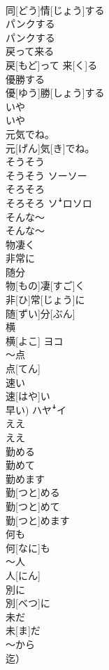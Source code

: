 \documentclass[8pt]{extreport}
\begin{document}
\begin{CJK}{UTF8}{min}
\\	同[どう]情[じょう]する	
\\	パンクする	
\\	パンクする	
\\	戻って来る	
\\	戻[もど]って 来[く]る	
\\	優勝する	
\\	優[ゆう]勝[しょう]する	
\\	いや	
\\	いや	
\\	元気でね。	
\\	元[げん]気[き]でね。
\\	そうそう	
\\	そうそう	ソーソー
\\	そろそろ	
\\	そろそろ	ソꜜロソロ
\\	そんな〜	
\\	そんな〜	
\\	物凄く 
\\	非常に 
\\	随分	
\\	物[もの]凄[すご]く 
\\	非[ひ]常[じょう]に 
\\	随[ずい]分[ぶん]	
\\	横	
\\	横[よこ]	ヨコ
\\	～点	
\\	点[てん]	
\\	速い	
\\	速[はや]い 
\\	早い)	ハヤꜜイ
\\	ええ	
\\	ええ	
\\	勤める 
\\	勤めて 
\\	勤めます	
\\	勤[つと]める 
\\	勤[つと]めて 
\\	勤[つと]めます	
\\	何も
\\	何[なに]も
\\	～人	
\\	人[にん]	
\\	別に 
\\	別[べつ]に
\\	未だ 
\\	未[ま]だ
\\	～から　
\\	迄）	

\end{CJK}
\end{document}
